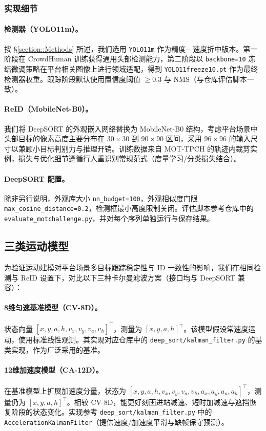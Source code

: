 \subsubsection{实现细节}
\paragraph{检测器（YOLO11m）。} 按 \S\ref{section::Methods} 所述，我们选用 \texttt{YOLO11m} 作为精度—速度折中版本。第一阶段在 CrowdHuman 训练获得通用头部检测能力，第二阶段以 \texttt{backbone=10} 冻结微调策略在平台相关图像上进行领域适配，得到 \texttt{YOLO11freeze10.pt} 作为最终检测器权重。跟踪阶段默认使用置信度阈值 \(\geq 0.3\) 与 NMS（与仓库评估脚本一致）。

\paragraph{ReID（MobileNet-B0）。} 我们将 DeepSORT 的外观嵌入网络替换为 MobileNet-B0 结构，考虑平台场景中头部目标的像素高度主要分布在 \(30\times 30\) 到 \(90\times 90\) 区间，采用 \(96\times 96\) 的输入尺寸以兼顾小目标判别力与推理开销。训练数据来自 MOT-TPCH 的轨迹内裁剪实例，损失与优化细节遵循行人重识别常规范式（度量学习/分类损失结合）。

\paragraph{DeepSORT 配置。} 除非另行说明，外观库大小 \texttt{nn\_budget=100}，外观相似度门限 \texttt{max\_cosine\_distance=0.2}，检测框最小高度限制关闭。评估脚本参考仓库中的 \texttt{evaluate\_motchallenge.py}，并对每个序列单独运行与保存结果。

\subsection{三类运动模型}
为验证运动建模对平台场景多目标跟踪稳定性与 ID 一致性的影响，我们在相同检测与 ReID 设置下，对比以下三种卡尔曼滤波方案（接口均与 DeepSORT 兼容）：

\paragraph{8维匀速基准模型（CV-8D）。} 状态向量 \([x, y, a, h, v_x, v_y, v_a, v_h]^\top\)，测量为 \([x, y, a, h]^\top\)。该模型假设常速度运动，使用标准线性观测。其实现对应仓库中的 \texttt{deep\_sort/kalman\_filter.py} 的基类实现，作为广泛采用的基准。

\paragraph{12维加速度模型（CA-12D）。} 在基准模型上扩展加速度分量，状态为 \([x, y, a, h, v_x, v_y, v_a, v_h, a_x, a_y, a_a, a_h]^\top\)，测量仍为 \([x, y, a, h]^\top\)。相较 CV-8D，能更好刻画进站减速、短时加减速与遮挡恢复阶段的状态变化。实现参考 \texttt{deep\_sort/kalman\_filter.py} 中的 \texttt{AccelerationKalmanFilter}（提供速度/加速度平滑与缺帧保守预测）。

